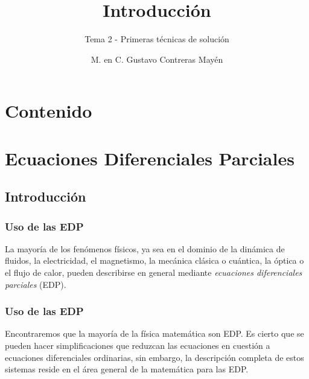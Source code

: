 
\title{\large{Introducción}}
\subtitle{Tema 2 - Primeras técnicas de solución}
\author{M. en C. Gustavo Contreras Mayén}
\date{}

\maketitle
\fontsize{14}{14}\selectfont
{}
\section*{Contenido}
\section{Ecuaciones Diferenciales Parciales}
\subsection{Introducción}
\begin{frame}
\frametitle{Uso de las EDP}
La mayoría de los fenómenos físicos, ya sea en el dominio de la dinámica de fluidos, la electricidad, el magnetismo, la mecánica clásica o cuántica, la óptica o el flujo de calor, pueden describirse en general mediante \emph{ecuaciones diferenciales parciales} (EDP).
\end{frame}
\begin{frame}
\frametitle{Uso de las EDP}
Encontraremos que la mayoría de la física matemática son EDP. Es cierto que se pueden hacer simplificaciones que reduzcan las ecuaciones en cuestión a ecuaciones diferenciales ordinarias, sin embargo, la descripción completa de estos sistemas reside en el área general de la matemática para las EDP.
\end{frame}
